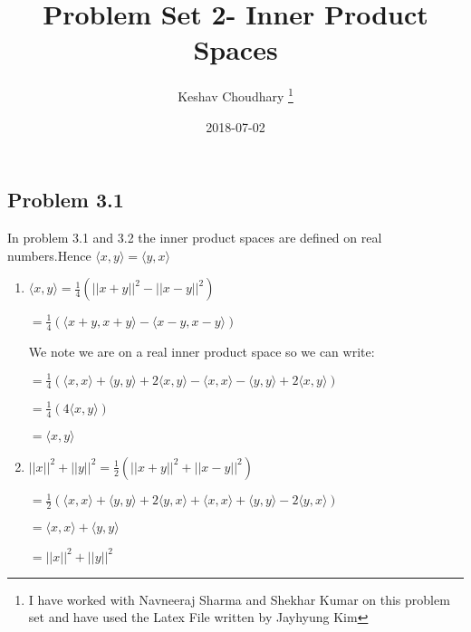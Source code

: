 \documentclass[letterpaper,12pt]{article}
\theoremstyle{definition}
\begin{document}
	\title{Problem Set 2- Inner Product Spaces\\
	}
	\author{
		Keshav Choudhary \footnote{I have worked with Navneeraj Sharma and Shekhar Kumar on this problem set and have used the Latex File written by Jayhyung Kim}\\[-2pt]
	}
	\date{2018-07-02}
	\vspace{-9mm}
	\maketitle
	\thispagestyle{empty}

	\pagestyle{fancy}
	\fancyhf{}
	\cfoot{\thepage}

	\begin{spacing}{1.3}{}
		\vspace{1 mm}


\subsection*{Problem 3.1}

	In problem 3.1 and 3.2 the inner product spaces are defined on real numbers.Hence $\langle x, y \rangle = 	\langle y, x \rangle $

\begin{enumerate}
  \item
	$\langle x, y \rangle = \frac{1}{4}(||x + y||^2 - ||x - y||^2)$

	$= \frac{1}{4}(\langle x + y, x + y \rangle - \langle x - y, x - y \rangle)$

	We note we are on a real inner product space so we can write:

	$= \frac{1}{4}(\langle x, x \rangle + \langle y, y \rangle + 2\langle x, y \rangle - \langle x, x \rangle - \langle y, y \rangle + 2\langle x, y \rangle)$

	$= \frac{1}{4}(4\langle x, y \rangle)$

	$= \langle x, y \rangle$
  \item
  	$||x||^2 + ||y||^2 = \frac{1}{2}(||x + y||^2 + ||x - y||^2)$

	$= \frac{1}{2}(\langle x, x \rangle + \langle y, y \rangle + 2\langle y, x \rangle + \langle x, x \rangle + \langle y, y \rangle - 2\langle y, x \rangle)$

	$= \langle x, x \rangle + \langle y, y \rangle$

	$= ||x||^2 + ||y||^2$

	\setlength{\leftskip}{0pt}
\end{enumerate}



\end{spacing}
\end{document}
